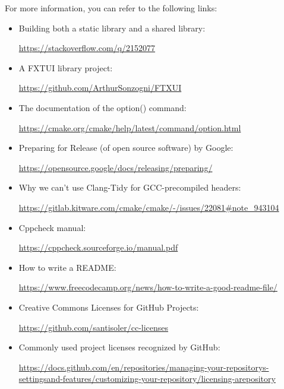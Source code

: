 For more information, you can refer to the following links:

\begin{itemize}
\item 
Building both a static library and a shared library: 

\url{https://stackoverflow.com/q/2152077}

\item 
A FXTUI library project:

\url{https://github.com/ArthurSonzogni/FTXUI}

\item 
The documentation of the option() command: 

\url{https://cmake.org/cmake/help/latest/command/option.html}

\item 
Preparing for Release (of open source software) by Google: 

\url{https://opensource.google/docs/releasing/preparing/}

\item 
Why we can't use Clang-Tidy for GCC-precompiled headers:

\url{https://gitlab.kitware.com/cmake/cmake/-/issues/22081\#note\_943104}

\item 
Cppcheck manual: 

\url{https://cppcheck.sourceforge.io/manual.pdf}

\item 
How to write a README: 

\url{https://www.freecodecamp.org/news/how-to-write-a-good-readme-file/}

\item 
Creative Commons Licenses for GitHub Projects:

\url{https://github.com/santisoler/cc-licenses}

\item 
Commonly used project licenses recognized by GitHub: 

\url{https://docs.github.com/en/repositories/managing-your-repositorys-settingsand-features/customizing-your-repository/licensing-arepository}
\end{itemize}